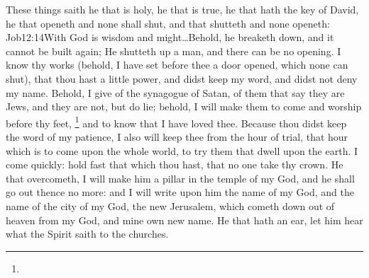 These things saith he that is holy, he that is true, he that hath the key of David, he that openeth and none shall shut, and that shutteth and none openeth:%
				{Job}{12:14}{With God is wisdom and might\ldots Behold, he breaketh down, and it cannot be built again; He shutteth up a man, and there can be no opening.}
I know thy works (behold, I have set before thee a door opened, which none can shut), that thou hast a little power, and didst keep my word, and didst not deny my name.   Behold, I give of the synagogue of Satan, of them that say they are Jews, and they are not, but do lie; behold, I will make them to come and worship before thy feet,%
	\footnote{ %
				}
 and to know that I have loved thee. %
Because thou didst keep the word of my patience, I also will keep thee from the hour of trial, that hour which is to come upon the whole world, to try them that dwell upon the earth. %
I come quickly: hold fast that which thou hast, that no one take thy crown. %
He that overcometh, I will make him a pillar in the temple of my God, and he shall go out thence no more: and I will write upon him the name of my God, and the name of the city of my God,%
 the new Jerusalem, which cometh down out of heaven from my God, and mine own new name. %
He that hath an ear, let him hear what the Spirit saith to the churches.
